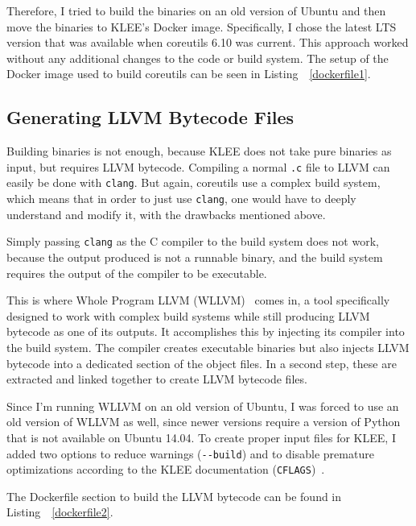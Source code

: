 \documentclass{article}
\let\savedCite=\cite
\renewcommand{\cite}{\unskip~\savedCite}
\let\savedRef=\ref
\renewcommand{\ref}{\unskip~\savedRef}
\begin{document}
Therefore, I tried to build the binaries on an old version of Ubuntu and then move the binaries to KLEE's Docker image. Specifically, I chose the latest LTS version that was available when coreutils 6.10 was current. This approach worked without any additional changes to the code or build system. The setup of the Docker image used to build coreutils can be seen in Listing~\ref{dockerfile1}.



\subsection{Generating LLVM Bytecode Files}
\label{LLVM}

Building binaries is not enough, because KLEE does not take pure binaries as input, but requires LLVM bytecode. Compiling a normal \lstinline{.c} file to LLVM can easily be done with \lstinline{clang}. But again, coreutils use a complex build system, which means that in order to just use \lstinline{clang}, one would have to deeply understand and modify it, with the drawbacks mentioned above.

Simply passing \lstinline{clang} as the C compiler to the build system does not work, because the output produced is not a runnable binary, and the build system requires the output of the compiler to be executable.

This is where Whole Program LLVM (WLLVM)\cite{WLLVM} comes in, a tool specifically designed to work with complex build systems while still producing LLVM bytecode as one of its outputs. It accomplishes this by injecting its compiler into the build system. The compiler creates executable binaries but also injects LLVM bytecode into a dedicated section of the object files. In a second step, these are extracted and linked together to create LLVM bytecode files.

Since I'm running WLLVM on an old version of Ubuntu, I was forced to use an old version of WLLVM as well, since newer versions require a version of Python that is not available on Ubuntu 14.04. To create proper input files for KLEE, I added two options to reduce warnings (\lstinline{--build}) and to disable premature optimizations according to the KLEE documentation (\lstinline{CFLAGS})\cite{KLEETutorial}.

The Dockerfile section to build the LLVM bytecode can be found in Listing~\ref{dockerfile2}.
\end{document}
